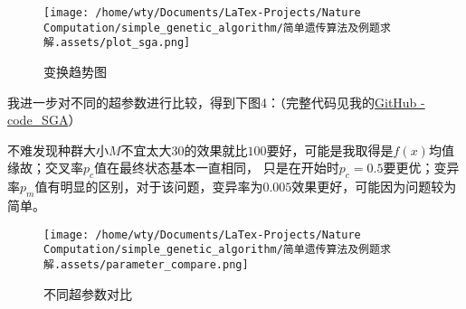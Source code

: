 \documentclass[12pt, a4paper, oneside]{ctexart}
\begin{document}
\begin{figure}[htbp]
\centering
\texttt{[image: /home/wty/Documents/LaTex-Projects/Nature Computation/simple\_genetic\_algorithm/简单遗传算法及例题求解.assets/plot\_sga.png]}
\caption{变换趋势图}
\end{figure}

我进一步对不同的超参数进行比较，得到下图4：（完整代码见我的\href{https://github.com/wty-yy/LaTex-Projects/tree/main/Nature%20Computation/code_SGA}{GitHub - code\_SGA}）

不难发现种群大小$M$不宜太大$30$的效果就比$100$要好，可能是我取得是$f(x)$均值缘故；交叉率$p_c$值在最终状态基本一直相同，
只是在开始时$p_c=0.5$要更优；变异率$p_m$值有明显的区别，对于该问题，变异率为$0.005$效果更好，可能因为问题较为简单。

\begin{figure}[htbp]
\hspace{-0.5cm}
\texttt{[image: /home/wty/Documents/LaTex-Projects/Nature Computation/simple\_genetic\_algorithm/简单遗传算法及例题求解.assets/parameter\_compare.png]}
\caption{不同超参数对比}
\end{figure}
\end{document}
